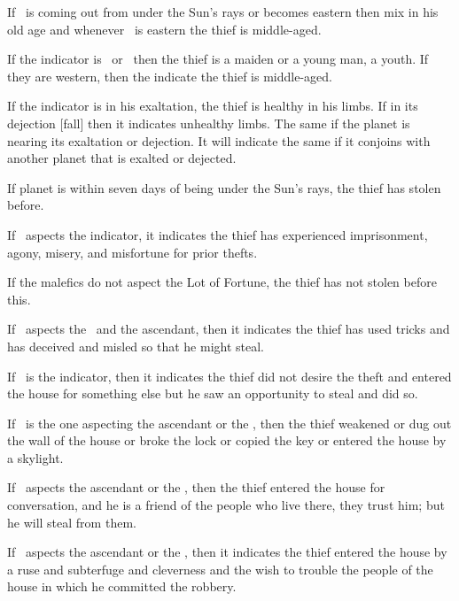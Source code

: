 If \Saturn\, is coming out from under the Sun's rays or becomes eastern then mix in his old age and whenever \Saturn\, is eastern the thief is middle-aged. 

If the indicator is \Mercury\, or \Venus\, then the thief is a maiden or a young man, a youth. If they are western, then the indicate the thief is middle-aged.

If the indicator is in his exaltation, the thief is healthy in his limbs. If in its dejection [fall] then it indicates unhealthy limbs. The same if the planet is nearing its exaltation or dejection. It will indicate the same if it conjoins with another planet that is exalted or dejected. 

If planet is within seven days of being under the Sun's rays, the thief has stolen before.

If \Mars\, aspects the indicator, it indicates the thief has experienced imprisonment, agony, misery, and misfortune for prior thefts.

If the malefics do not aspect the Lot of Fortune, the thief has not stolen before this.

If \Saturn\, aspects the \Moon\, and the ascendant, then it indicates the thief has used tricks and has deceived and misled so that he might steal.

If \Jupiter\, is the indicator, then it indicates the thief did not desire the theft and entered the house for something else but he saw an opportunity to steal and did so.

If \Mars\, is the one aspecting the ascendant or the \Moon, then the thief weakened or dug out the wall of the house or broke the lock or copied the key or entered the house by a skylight.

If \Venus\, aspects the ascendant or the \Moon, then the thief entered the house for conversation, and he is a friend of the people who live there, they trust him; but he will steal from them.

If \Mercury\, aspects the ascendant or the \Moon, then it indicates the thief entered the house by a ruse and subterfuge and cleverness and the wish to trouble the people of the house in which he committed the robbery.




